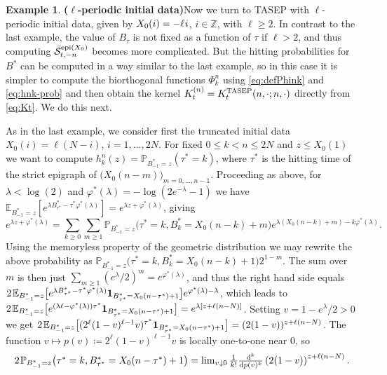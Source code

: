 \documentclass[letterpaper,reqno,11pt,oneside,final]{amsart}
\theoremstyle{definition}
\newtheorem{ex}[thm]{Example}
\newcommand{\pp}{\mathbb{P}}
\newcommand{\ee}{\mathbb{E}}
\newcommand{\zz}{\mathbb{Z}}
\newcommand{\uno}[1]{\mathbf{1}_{#1}}
\newcommand{\ts}{\hspace{0.1em}}
\newcommand{\tts}{\hspace{0.05em}}
\newcommand{\uptext}[1]{\text{\upshape{#1}}}
\DeclareMathOperator{\epi}{\uptext{epi}}
\renewcommand{\d}{\mathrm{d}}
\newcommand{\TASEP}{\uptext{TASEP}}
\newcommand{\SN}{\bar{\mathcal{S}}}
\numberwithin{equation}{section}
\begin{document}
\begin{ex}{\bf ($\bm{\ell}$-periodic initial data)}\label{example210}
\enspace Now we turn to TASEP with $\ell$-periodic initial data, given by $X_0(i)=-\ell\tts i$, $i\in\zz$, with $\ell\geq 2$.
In contrast to the last example, the value of $B_\tau$ is not fixed as a function of $\tau$ if $\ell > 2$, and thus computing $\SN^{\epi(X_0)}_{t,-n}$ becomes more complicated.
But the hitting probabilities for $B^*$ can be computed in a way similar to the last example, so in this case it is simpler to compute the biorthogonal functions $\Phi^n_k$ using \eqref{eq:defPhink} and \eqref{eq:hnk-prob} and then obtain the kernel $K^{(n)}_t=K^\TASEP_t(n,\cdot;n,\cdot)$ directly from \eqref{eq:Kt}.
We do this next.

\noindent As in the last example, we consider first the truncated initial data $X_0(i) = \ell(N-i)$, $i=1,\dotsc,2N$.
For fixed $0\leq k<n\leq2N$ and $z \leq X_0(1)$ we want to compute $h^n_k(z)=\pp_{B^*_{-1}=z}(\tau^*=k)$, where $\tau^*$ is the hitting time of the strict epigraph of $\big(X_0(n-m)\big)_{m=0,\dotsc,n-1}$.
Proceeding as above, for $\lambda < \log(2)$ and $\varphi^*(\lambda)=-\log(2e^{-\lambda}-1)$ we have $\ee_{B^*_{-1}=z}[e^{\lambda B^*_{\tau^*}-\tau^*\varphi^*(\lambda)}]=e^{\lambda z + \varphi^*(\lambda)}$, giving
\[\textstyle e^{\lambda z + \varphi^*(\lambda)} = \sum_{k \geq 0} \sum_{m \geq 1} \pp_{B^*_{-1}=z} \big(\tau^* = k, B^*_k = X_0(n - k) + m \big) e^{\lambda (X_0(n-k) + m)-k\varphi^*(\lambda)}.\]
Using the memoryless property of the geometric distribution we may rewrite the above probability as $\pp_{B^*_{-1}=z}\big(\tau^* = k, B^*_k = X_0(n - k) + 1 \big) 2^{1 - m}$.
The sum over $m$ is then just $\sum_{m \geq 1}(e^\lambda/2)^m = e^{\varphi^*(\lambda)}$, and thus the right hand side equals $2\ts\ee_{B^*_{-1}=z} \big[e^{\lambda B^*_{\tau^*} - \tau^* \varphi^*(\lambda)} \uno{B^*_{\tau^*} = X_0(n - \tau^*) + 1} \big] e^{\varphi^*(\lambda)-\lambda}$, which leads to $2\ts\ee_{B^*_{-1}=z} \big[e^{(\lambda\ell - \varphi^*(\lambda))\tau^*} \uno{B^*_{\tau^*} = X_0(n - \tau^*) + 1} \big] = e^{\lambda [z + \ell(n-N)]}$.
Setting $v = 1 - e^{\lambda}/2 > 0$ we get $2\ts\ee_{B^*_{-1}=z} \big[ (2^\ell (1-v)^{\ell-1} v)^{\tau^*} \uno{B^*_{\tau^*} = X_0(n - \tau^*) + 1} \big] = (2(1-v))^{z + \ell(n-N)}$.
The function $v \longmapsto p(v) \coloneqq 2^\ell (1-v)^{\ell-1} v$ is locally one-to-one near $0$, so
\begin{equation}
 \textstyle2\ts\pp_{B^*_{-1}=z} \big(\tau^* = k, B^*_{\tau^*} = X_0(n - \tau^*) + 1 \big) = \lim_{v \downarrow 0} \frac{1}{k!} \frac{\d^k}{\d p(v)^k} \left(2(1-v)\right)^{z + \ell(n-N)}.

\end{equation}
\end{ex}
\end{document}
